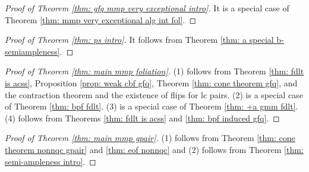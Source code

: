 \documentclass[11pt]{amsart}
\numberwithin{equation}{section}
\theoremstyle{definition}
\theoremstyle{definition}
\theoremstyle{definition}
\begin{document}
\begin{proof}[Proof of Theorem \ref{thm: gfq mmp very exceptional intro}]
It is a special case of Theorem \ref{thm: mmp very exceptional alg int fol}.
\end{proof}


\begin{proof}[Proof of Theorem \ref{thm: ps intro}]
It follows from Theorem \ref{thm: a special b-semiampleness}.
\end{proof}

\begin{proof}[Proof of Theorem \ref{thm: main mmp foliation}]
(1) follows from Theorem \ref{thm: fdlt is acss}, Proposition \ref{prop: weak cbf gfq}, Theorem \ref{thm: cone theorem gfq}, and the contraction theorem and the existence of flips for lc pairs. (2) is a special case of Theorem \ref{thm: bpf fdlt}. (3) is a special case of Theorem \ref{thm: +a gmm fdlt}. (4) follows from Theorems \ref{thm: fdlt is acss} and \ref{thm: bpf induced gfq}.
\end{proof}

\begin{proof}[Proof of Theorem \ref{thm: main mmp gpair}]
    (1) follows from Theorem \ref{thm: cone theorem nonnqc gpair} and \ref{thm: eof nonnqc} and (2) follows from Theorem \ref{thm: semi-ampleness intro}.
\end{proof}
\end{document}
